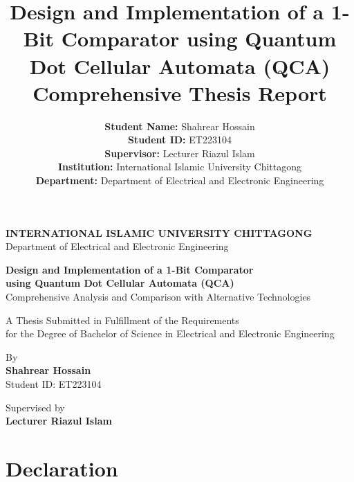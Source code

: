 \documentclass[12pt,a4paper,twoside]{report}
\title{%
\vspace*{-2cm}
\Large\textbf{Design and Implementation of a 1-Bit Comparator using Quantum Dot Cellular Automata (QCA)}\\
\vspace{0.5cm}
\large Comprehensive Thesis Report
}
\author{%
\textbf{Student Name:} Shahrear Hossain\\
\textbf{Student ID:} ET223104\\
\vspace{0.5cm}
\textbf{Supervisor:} Lecturer Riazul Islam\\
\vspace{0.5cm}
\textbf{Institution:} International Islamic University Chittagong\\
\textbf{Department:} Department of Electrical and Electronic Engineering
}
\date{}
\begin{document}
\begin{titlepage}
    \centering
    \vspace*{-1cm}
    
    {\Large \textbf{INTERNATIONAL ISLAMIC UNIVERSITY CHITTAGONG}}\\
    \vspace{0.2cm}
    {\large Department of Electrical and Electronic Engineering}\\
    \vspace{2cm}
    
    {\LARGE \textbf{Design and Implementation of a 1-Bit Comparator}}\\
    {\LARGE \textbf{using Quantum Dot Cellular Automata (QCA)}}\\
    \vspace{0.5cm}
    {\large Comprehensive Analysis and Comparison with Alternative Technologies}\\
    \vspace{2cm}
    
    {\Large A Thesis Submitted in Fulfillment of the Requirements}\\
    {\Large for the Degree of Bachelor of Science in Electrical and Electronic Engineering}\\
    \vspace{3cm}
    
    {\Large By}\\
    \vspace{0.5cm}
    {\textbf{\Large Shahrear Hossain}}\\
    {\large Student ID: ET223104}\\
    \vspace{2cm}
    
    {\large Supervised by}\\
    \vspace{0.5cm}
    {\textbf{\large Lecturer Riazul Islam}}\\
    \vspace{3cm}
    
    \vfill
\end{titlepage}

\chapter*{Declaration}
\end{document}
